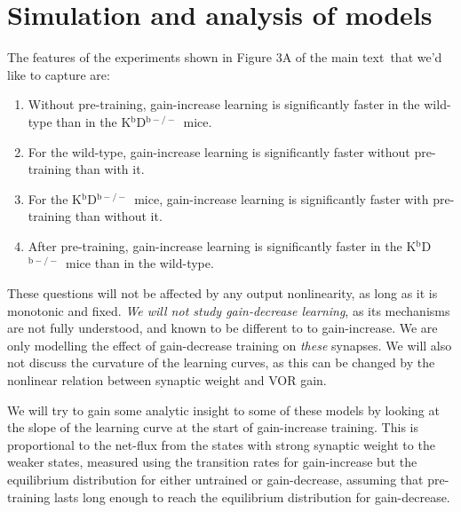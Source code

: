 \documentclass[10pt]{article}
\newcommand{\KO}{K$^\mathrm{b}$D$^{\mathrm{b}-/-}$}
\newcommand{\modelfig}[1][A]{Figure 3#1 of the main text}
\begin{document}




\section{Simulation and analysis of models}\label{sec:results}

The features of the experiments shown in \modelfig\ that we'd like to capture are:
%
\begin{enumerate}
  \item Without pre-training, gain-increase learning is significantly faster in the wild-type than in the \KO\ mice.
  \item For the wild-type, gain-increase learning is significantly faster without pre-training than with it.
  \item For the \KO\ mice, gain-increase learning is significantly faster with pre-training than without it.
  \item After pre-training, gain-increase learning is significantly faster in the \KO\ mice than in the wild-type.
\end{enumerate}
%
These questions will not be affected by any output nonlinearity, as long as it is monotonic and fixed.
\emph{We will not study gain-decrease learning}, as its mechanisms are not fully understood, and known to be different to to gain-increase.
We are only modelling the effect of gain-decrease training on \emph{these} synapses.
We will also not discuss the curvature of the learning curves, as this can be changed by the nonlinear relation between synaptic weight and VOR gain.

We will try to gain some analytic insight to some of these models by looking at the slope of the learning curve at the start of gain-increase training.
This is proportional to the net-flux from the states with strong synaptic weight to the weaker states, measured using the transition rates for gain-increase but the equilibrium distribution for either untrained or gain-decrease, assuming that pre-training lasts long enough to reach the equilibrium distribution for gain-decrease.
\end{document}

